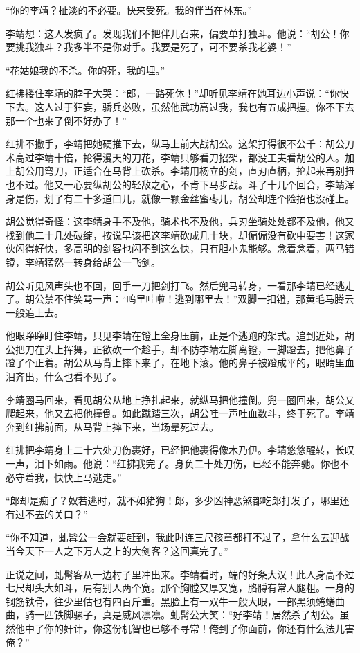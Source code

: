 “你的李靖？扯淡的不必要。快来受死。我的伴当在林东。”

李靖想：这人发疯了。发现我们不把伴儿召来，偏要单打独斗。他说：“胡公！你要挑我独斗？我多半不是你对手。我要是死了，可不要杀我老婆！”

“花姑娘我的不杀。你的死，我的埋。”

红拂搂住李靖的脖子大哭：“郎，一路死休！”却听见李靖在她耳边小声说：“你快下去。这人过于狂妄，骄兵必败，虽然他武功高过我，我也有五成把握。你不下去那一个也来了倒不好办了！”

红拂不撒手，李靖把她硬推下去，纵马上前大战胡公。这架打得很不公千：胡公刀术高过李靖十倍，抡得漫天的刀花，李靖只够看刀招架，都没工夫看胡公的人。加上胡公用弯刀，正适合在马背上砍杀。李靖用杨立的剑，直刃直柄，抡起来再别扭也不过。他又一心要纵胡公的轻敌之心，不肯下马步战。斗了十几个回合，李靖浑身是伤，划了有二十多道口儿，就像一颗金丝蜜枣儿，胡公却连个险招也没碰上。

胡公觉得奇怪：这李靖身手不及他，骑术也不及他，兵刃坐骑处处都不及他，他又找到他二十几处破绽，按说早该把这李靖砍成几十块，却偏偏没有砍中要害！这家伙闪得好快，多高明的剑客也闪不到这么快，只有胆小鬼能够。念着念着，两马错镫，李靖猛然一转身给胡公一飞剑。

胡公听见风声头也不回，回手一刀把剑打飞。然后兜马转身，一看那李靖已经逃走了。胡公禁不住笑骂一声：“呜里哇啦！逃到哪里去！”双脚一扣镫，那黄毛马腾云一般追上去。

他眼睁睁盯住李靖，只见李靖在镫上全身压前，正是个逃跑的架式。追到近处，胡公把刀在头上挥舞，正欲砍一个趁手，却不防李靖左脚离镫，一脚蹬去，把他鼻子蹬了个正着。胡公从马背上摔下来了，在地下滚。他的鼻子被蹬成平的，眼睛里血泪齐出，什么也看不见了。

李靖圈马回来，看见胡公从地上挣扎起来，就纵马把他撞倒。兜一圈回来，胡公又爬起来，他又去把他撞倒。如此蹴踏三次，胡公哇一声吐血数斗，终于死了。李靖奔到红拂前面，从马背上摔下来，当场晕死过去。

红拂把李靖身上二十六处刀伤裹好，已经把他裹得像木乃伊。李靖悠悠醒转，长叹一声，泪下如雨。他说：“红拂我完了。身负二十处刀伤，已经不能奔驰。你也不必守着我，快快上马逃走。”

“郎却是痴了？奴若逃时，就不如猪狗！郎，多少凶神恶煞都吃郎打发了，哪里还有过不去的关口？”

“你不知道，虬髯公一会就要赶到，我此时连三尺孩童都打不过了，拿什么去迎战当今天下一人之下万人之上的大剑客？这回真完了。”

正说之间，虬髯客从一边村子里冲出来。李靖看时，端的好条大汉！此人身高不过七尺却头大如斗，肩有别人两个宽。那个胸膛又厚又宽，胳膊有常人腿粗。一身的钢筋铁骨，往少里估也有四百斤重。黑脸上有一双牛一般大眼，一部黑须蜷蜷曲曲，骑一匹铁脚骡子，真是威风凛凛。虬髯公大笑：“好李靖！居然杀了胡公。虽然他中了你的奸计，你这份机智也已够不寻常！俺到了你面前，你还有什么法儿害俺？”

